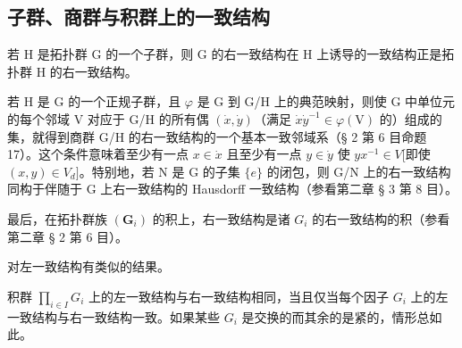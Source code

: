 \subsection{子群、商群与积群上的一致结构}

若 H 是拓扑群 G 的一个子群，则 G 的右一致结构在 H 上诱导的一致结构正是拓扑群 H 的右一致结构。

若 H 是 G 的一个正规子群，且 \(\varphi\) 是 G 到 G/H 上的典范映射，则使 G 中单位元的每个邻域 V 对应于 G/H 的所有偶 \((\dot{x},\dot{y})\)（满足 \(\dot{x}\dot{y}^{-1}\in \varphi (\mathrm{V})\) 的）组成的集，就得到商群 G/H 的右一致结构的一个基本一致邻域系（§ 2 第 6 目命题 17）。这个条件意味着至少有一点 \(x\in \dot{x}\) 且至少有一点 \(y\in \dot{y}\) 使 \(yx^{-1}\in V\){[}即使 \((x,y)\in V_d]\)。特别地，若 N 是 G 的子集 \(\{e\}\) 的闭包，则 G/N 上的右一致结构同构于伴随于 G 上右一致结构的 Hausdorff 一致结构（参看第二章 § 3 第 8 目）。

最后，在拓扑群族 \((\mathbf{G}_{i})\) 的积上，右一致结构是诸 \(G_{i}\) 的右一致结构的积（参看第二章 § 2 第 6 目）。

对左一致结构有类似的结果。

积群 \(\prod_{i\in I}G_i\) 上的左一致结构与右一致结构相同，当且仅当每个因子 \(G_{i}\) 上的左一致结构与右一致结构一致。如果某些 \(G_{i}\) 是交换的而其余的是紧的，情形总如此。

